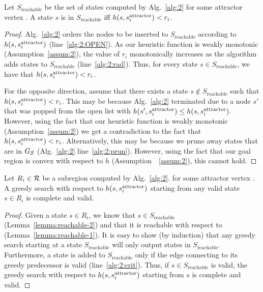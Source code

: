 \documentclass[a4paper,10pt]{article}
\begin{document}
\begin{lemma}
\label{lemma:reachable-2}
Let $S_{\text{reachable}}$ be the set of states computed by Alg.~\ref{alg:2} for some attractor vertex \sAttract.
%
A state $s$ is in $S_{\text{reachable}}$ iff $h(s, s^{\text{attractor}}_i) < r_i$.
\end{lemma}

\begin{proof}
Alg.~\ref{alg:2} orders the nodes to be inserted to $S_{\text{reachable}}$ according to $h(s, s^{\text{attractor}}_i)$ (line~\ref{alg:2:OPEN}).
As our heuristic function is weakly monotonic (Assumption~\ref{assum:2}), the value of $r_i$ monotonically increases as the algorithm adds states to $S_{\text{reachable}}$ (line~\ref{alg:2:rad}).
Thus, for every state $s \in S_{\text{reachable}}$, we have that $h(s, s^{\text{attractor}}_i) < r_i$.

For the opposite direction, assume that there exists a state $s \notin S_{\text{reachable}}$ such that $h(s, s^{\text{attractor}}_i) < r_i$.
This may be because  Alg.~\ref{alg:2} terminated due to a node $s'$ that was popped from the open list with 
$h(s', s^{\text{attractor}}_i) \leq h(s, s^{\text{attractor}}_i)$.
However, using the fact that our heuristic function is weakly monotonic (Assumption~\ref{assum:2}) we get a contradiction to the fact that $h(s, s^{\text{attractor}}_i) < r_i$.
Alternatively, this may be because we prune away states that are in $G_\mathcal{S}$  (Alg.~\ref{alg:2} line~\ref{alg:2:prun}).
However, using the fact that our goal region is convex with respect to $h$ (Assumption~~\ref{assum:2}), this cannot hold.
\end{proof}

\begin{lemma}
\label{lemma:greedy}
Let $R_i \in \mathcal{R}$ be a subregion computed by Alg.~\ref{alg:2}.
for some attractor vertex \sAttract.
% 
A greedy search with respect to $h(s, s^{\text{attractor}}_i)$  starting from any valid state $s \in R_i$ is complete and valid.
\end{lemma}

\begin{proof}
Given a state $s \in R_i$, we know that $s \in S_{\text{reachable}}$ (Lemma~\ref{lemma:reachable-2})
and that it is reachable with respect to \sAttract (Lemma~\ref{lemma:reachable-1}).
%
It is easy to show (by induction) that any greedy search starting at a state $S_{\text{reachable}}$ will only output states in $S_{\text{reachable}}$.
Furthermore, a state is added to $S_{\text{reachable}}$ only if the edge connecting to its greedy predecessor is valid (line~\ref{alg:2:crit}).
Thus, if $s\in S_{\text{reachable}}$ is valid, the greedy search with respect to $h(s, s^{\text{attractor}}_i)$  starting from $s$ is complete and valid.
\end{proof}
\end{document}

